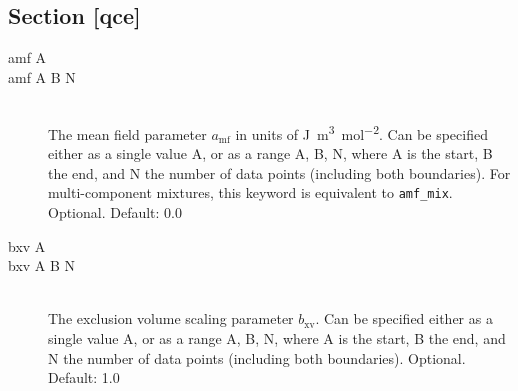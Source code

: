 \documentclass{scrartcl}
\newcommand{\amf}{a_\mathrm{mf}}
\newcommand{\bxv}{b_\mathrm{xv}}
\begin{document}
\subsection{Section [qce]}

\begin{description}
    \item[amf A]
    \item[amf A B N] \hfill \\
        The mean field parameter $\amf$ in units of \si{\joule\cubic\meter\per\mole\squared}.
        Can be specified either as a single value A, or as a range A, B, N, where A is the start, B the end, and N the number of data points (including both boundaries).
        For multi-component mixtures, this keyword is equivalent to \texttt{amf\_mix}.
        Optional. Default: 0.0
        \vspace{0.1cm}
    \item[bxv A]
    \item[bxv A B N] \hfill \\
        The exclusion volume scaling parameter $\bxv$.
        Can be specified either as a single value A, or as a range A, B, N, where A is the start, B the end, and N the number of data points (including both boundaries).
        Optional. Default: 1.0
        \vspace{0.1cm}

\end{description}
\end{document}
